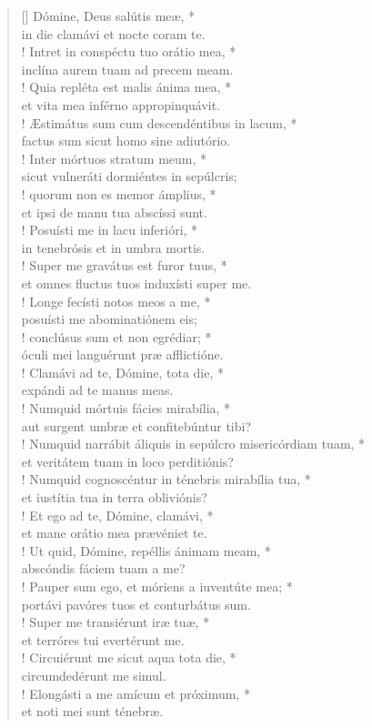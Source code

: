 \begin{verse}[\versewidth]
Dómine, Deus salútis meæ, *\\
in die clamávi et nocte coram te.\\!
\vin Intret in conspéctu tuo orátio mea, *\\
\vin inclína aurem tuam ad precem meam.\\!
Quia repléta est malis ánima mea, *\\
et vita mea inférno appropinquávit.\\!
\vin Æstimátus sum cum descendéntibus in lacum, *\\
\vin factus sum sicut homo sine adiutório.\\!
Inter mórtuos stratum meum, *\\
sicut vulneráti dormiéntes in sepúlcris;\\!
\vin quorum non es memor ámplius, *\\
\vin et ipsi de manu tua abscíssi sunt.\\!
Posuísti me in lacu inferióri, *\\
in tenebrósis et in umbra mortis.\\!
\vin Super me gravátus est furor tuus, *\\
\vin et omnes fluctus tuos induxísti super me.\\!
Longe fecísti notos meos a me, *\\
posuísti me abominatiónem eis;\\!
\vin conclúsus sum et non egrédiar; *\\
\vin óculi mei languérunt præ afflictióne.\\!
Clamávi ad te, Dómine, tota die, *\\
expándi ad te manus meas.\\!
\vin Numquid mórtuis fácies mirabília, *\\
\vin aut surgent umbræ et confitebúntur tibi?\\!
Numquid narrábit áliquis in sepúlcro misericórdiam tuam, *\\
et veritátem tuam in loco perditiónis?\\!
\vin Numquid cognoscéntur in ténebris mirabília tua, *\\
\vin et iustítia tua in terra obliviónis?\\!
Et ego ad te, Dómine, clamávi, *\\
et mane orátio mea prævéniet te.\\!
\vin Ut quid, Dómine, repéllis ánimam meam, *\\
\vin abscóndis fáciem tuam a me?\\!
Pauper sum ego, et móriens a iuventúte mea; *\\
portávi pavóres tuos et conturbátus sum.\\!
\vin Super me transiérunt iræ tuæ, *\\
\vin et terróres tui evertérunt me.\\!
Circuiérunt me sicut aqua tota die, *\\
circumdedérunt me simul.\\!
\vin Elongásti a me amícum et próximum, *\\
\vin et noti mei sunt ténebræ.\\
\end{verse}
\vspace{1cm}


